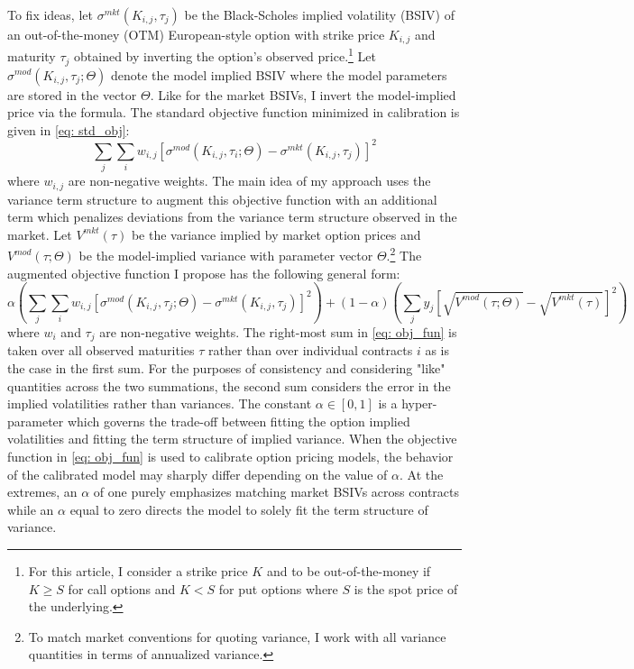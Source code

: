 \documentclass[12pt]{article}
\begin{document}
To fix ideas, let $\sigma^{mkt}(K_{i,j}, \tau_j)$ be the Black-Scholes implied volatility (BSIV) of an out-of-the-money (OTM) European-style option with strike price $K_{i,j}$ and maturity $\tau_j$ obtained by inverting the option's observed price.\footnote{For this article, I consider a strike price $K$ and to be out-of-the-money if $K \geq S$ for call options and $K < S$ for put options where $S$ is the spot price of the underlying.} Let $\sigma^{mod}(K_{i,j}, \tau_j;  \Theta)$ denote the model implied BSIV where the model parameters are stored in the vector $\Theta$. Like for the market BSIVs, I invert the model-implied price via the \cite{black1973pricing} formula. The standard objective function minimized in calibration is given in \eqref{eq: std_obj}:
\begin{equation}\label{eq: std_obj}
    \sum\limits_{j}\sum\limits_{i} w_{i,j}\left[\sigma^{mod}(K_{i,j}, \tau_i; \Theta) - \sigma^{mkt}(K_{i,j}, \tau_j)\right]^2 
\end{equation}
where $w_{i,j}$ are non-negative weights. The main idea of my approach uses the variance term structure to augment this objective function with an additional term which penalizes deviations from the variance term structure observed in the market. Let $V^{mkt}(\tau)$ be the variance implied by market option prices and $V^{mod}(\tau; \Theta)$ be the model-implied variance with parameter vector $\Theta$.\footnote{To match market conventions for quoting variance, I work with all variance quantities in terms of annualized variance.} The augmented objective function I propose has the following general form:
\begin{equation}\label{eq: obj_fun}
    \alpha \left(\sum\limits_j\sum\limits_{i} w_{i,j}\left[\sigma^{mod}(K_{i,j}, \tau_j; \Theta) - \sigma^{mkt}(K_{i,j}, \tau_j)\right]^2\right)  + (1-\alpha) \left(\sum\limits_{j} y_j \left[\sqrt{V^{mod}(\tau; \Theta)} - \sqrt{V^{mkt}(\tau)}\right]^2\right) 
\end{equation}
where $w_i$ and $\tau_j$ are non-negative weights. The right-most sum in \eqref{eq: obj_fun} is taken over all observed maturities $\tau$ rather than over individual contracts $i$ as is the case in the first sum. For the purposes of consistency and considering "like" quantities across the two summations, the second sum considers the error in the implied volatilities rather than variances. The constant $\alpha \in [0,1]$ is a hyper-parameter which governs the trade-off between fitting the option implied volatilities and fitting the term structure of implied variance. When the objective function in \eqref{eq: obj_fun} is used to calibrate option pricing models, the behavior of the calibrated model may sharply differ depending on the value of $\alpha$. At the extremes, an $\alpha$ of one purely emphasizes matching market BSIVs across contracts while an $\alpha$ equal to zero directs the model to solely fit the term structure of variance. 
\end{document}
